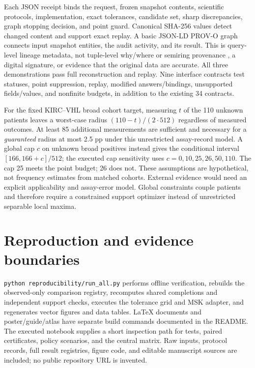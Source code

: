 \documentclass[10pt,letterpaper]{article}
\begin{document}
Each JSON receipt binds the request, frozen snapshot contents, scientific protocols, implementation, exact tolerances, candidate set, sharp discrepancies, graph stopping decision, and point guard. Canonical SHA-256 values detect changed content and support exact replay. A basic JSON-LD PROV-O graph \cite{prov} connects input snapshot entities, the audit activity, and its result. This is query-level lineage metadata, not tuple-level why/where or semiring provenance \cite{buneman,green}, a digital signature, or evidence that the original data are accurate. All three demonstrations pass full reconstruction and replay. Nine interface contracts test statuses, point suppression, replay, modified answers/bindings, unsupported fields/values, and nonfinite budgets, in addition to the existing 34 contracts.

For the fixed KIRC--VHL broad cohort target, measuring $t$ of the 110 unknown patients leaves a worst-case radius $(110-t)/(2\cdot512)$ regardless of measured outcomes. At least 85 additional measurements are sufficient and necessary for a \emph{guaranteed} radius at most 2.5 pp under this unrestricted assay-record model. A global cap $c$ on unknown broad positives instead gives the conditional interval $[166,166+c]/512$; the executed cap sensitivity uses $c=0,10,25,26,50,110$. The cap 25 meets the point budget; 26 does not. These assumptions are hypothetical, not frequency estimates from matched cohorts. External evidence would need an explicit applicability and assay-error model. Global constraints couple patients and therefore require a constrained support optimizer instead of unrestricted separable local maxima.

\section{Reproduction and evidence boundaries}
\texttt{python reproducibility/run\_all.py} performs offline verification, rebuilds the observed-only comparison registry, recomputes shared completions and independent support checks, executes the tolerance grid and MSK adapter, and regenerates vector figures and data tables. LaTeX documents and poster/guide/atlas have separate build commands documented in the README. The executed notebook supplies a short inspection path for tests, paired certificates, policy scenarios, and the central matrix. Raw inputs, protocol records, full result registries, figure code, and editable manuscript sources are included; no public repository URL is invented.
\end{document}
